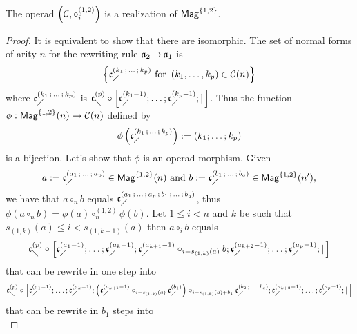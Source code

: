 \begin{Proposition} \label{prop:Realisation_Mag_1_2}
The operad
$\left(\mathcal{C}, \circ_i^{(1,2)}\right)$
is a realization of $\mathsf{Mag}^{\{1, 2\}}$.
\end{Proposition}
\begin{proof}
It is equivalent to show that there are isomorphic. The set of normal
forms of arity $n$ for the rewriting rule $\mathfrak{a}_2 \operatorname{\to} \mathfrak{a}_1$ is
\begin{equation} \label{equ:Normal_forms_A2}
\left\{ \mathfrak{c}^{\left(k_1 \, ; \, \dots \, ; \, k_p\right)}_{\diagup} \text{ for }
\left(k_1, \dots, k_p\right) \in \mathcal{C}(n) \right\}
\end{equation}
where $\mathfrak{c}^{\left(k_1 \, ; \, \dots \, ; \, k_p\right)}_{\diagup}$ is
$\mathfrak{c}^{\left(p\right)}_{\diagdown} \circ \left[\mathfrak{c}^{\left(k_1-1\right)}_{\diagup}; \dots ; \mathfrak{c}^{\left(k_p-1\right)}_{\diagup}
; | \, \right]$.
Thus the function
$\phi : \mathsf{Mag}^{\{1, 2\}}(n) \rightarrow \mathcal{C}(n)$ defined by
\begin{equation} \label{equ:Morphism_A2}
\phi\left( \mathfrak{c}^{\left(k_1 \, ; \, \dots \, ; \, k_p\right)}_{\diagup} \right) :=
\left(k_1 ; \dots ; k_p  \right)
\end{equation}
is a bijection. Let's show that $\phi$ is an operad morphism. Given
\begin{equation}
a := \mathfrak{c}^{\left(a_1 \, ; \, \dots \, ; \, a_p\right)}_{\diagup} \in \mathsf{Mag}^{\{1, 2\}}(n) \text{ and }
b := \mathfrak{c}^{\left(b_1 \, ; \, \dots \, ; \, b_q\right)}_{\diagup} \in \mathsf{Mag}^{\{1, 2\}}(n'),
\end{equation}
we have that $a \circ_n b$ equals $\mathfrak{c}^{\left(a_1 \, ; \, \dots \, ; \, a_p
 \, ; \, b_1 \, ; \, \dots \, ; \, b_q\right)}_{\diagup}$, thus
 $\phi\left(a \circ_n b\right) = \phi\left(a\right) \circ_n^{(1,2)}
 \phi\left(b\right)$. Let $1 \leq i < n$ and $k$ be such that
 $s_{(1, k)}(a) \leq i < s_{(1, k+1)}(a)$ then $a \circ_i b$ equals
\begin{equation} \label{equ:Rewriting_1_Mag_1_2}
\mathfrak{c}^{\left(p\right)}_{\diagdown} \circ \left[\mathfrak{c}^{\left(a_1-1\right)}_{\diagup}; \dots ; \mathfrak{c}^{\left(a_k-1\right)}_{\diagup};
\mathfrak{c}^{\left(a_{k+1}-1\right)}_{\diagup}
\circ_{i-s_{(1,k)}(a)} b  ; \mathfrak{c}^{\left(a_{k+2}-1\right)}_{\diagup} ; \dots; \mathfrak{c}^{\left(a_p-1\right)}_{\diagup} ;
| \, \right]
\end{equation}
that can be rewrite in one step into
\begin{equation}
\mathfrak{c}^{\left(p\right)}_{\diagdown} \circ \left[\mathfrak{c}^{\left(a_1-1\right)}_{\diagup}; \dots ; \mathfrak{c}^{\left(a_k-1\right)}_{\diagup}; \left(
\mathfrak{c}^{\left(a_{k+1}-1\right)}_{\diagup} \circ_{i-s_{(1,k)}(a)}  \mathfrak{c}^{\left(b_1\right)}_{\diagup} \right)
\circ_{i-s_{(1,k)}(a)+b_1} \mathfrak{c}^{\left(b_2 \, ; \, \dots \, ; \, b_q\right)}_{\diagup} ;
\mathfrak{c}^{\left(a_{k+2}-1\right)}_{\diagup} ; \dots; \mathfrak{c}^{\left(a_p-1\right)}_{\diagup} ; | \, \right]
\end{equation}
that can be rewrite in $b_1$ steps into
\begin{equation} \label{equ:Rewriting_2_Mag_1_2}

\end{equation}
\end{proof}
